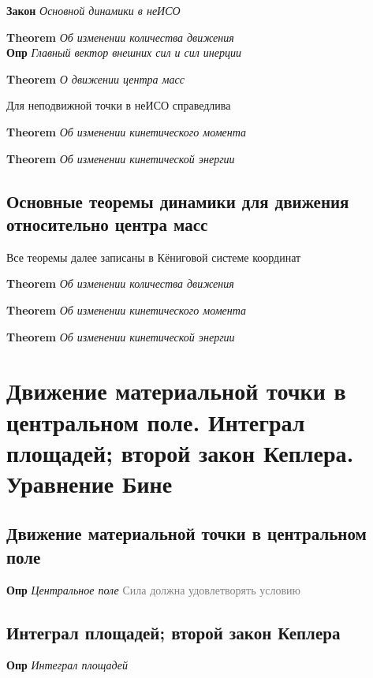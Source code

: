 \documentclass[a4paper, 14pt]{article}
\begin{document}
    \textbf{Закон} \textit{Основной динамики в неИСО}
    
    \textbf{Theorem} \textit{Об изменении количества движения} \\
    
    \textbf{Опр} \textit{Главный вектор внешних сил и сил инерции}
    
    \textbf{Theorem} \textit{О движении центра масс}
    
    Для неподвижной точки в неИСО справедлива
    
    \textbf{Theorem} \textit{Об изменении кинетического момента}
    
    \textbf{Theorem} \textit{Об изменении кинетической энергии} \\
    
    \subsection{Основные теоремы динамики для движения относительно центра масс}
    
    Все теоремы далее записаны в Кёниговой системе координат
    
    \textbf{Theorem} \textit{Об изменении количества движения}
    
    \textbf{Theorem} \textit{Об изменении кинетического момента}
    
    \textbf{Theorem} \textit{Об изменении кинетической энергии}
    
    \section{Движение материальной точки в центральном поле.
    Интеграл площадей; второй закон Кеплера.
    Уравнение Бине}
    
    \subsection{Движение материальной точки в центральном поле}
    
    \textbf{Опр} \textit{Центральное поле} \textcolor{gray}{Сила должна удовлетворять условию}
    
    \subsection{Интеграл площадей; второй закон Кеплера}
    
    \textbf{Опр} \textit{Интеграл площадей}
    
\end{document}
